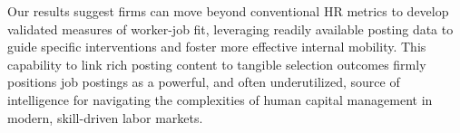 Our results suggest firms can move beyond conventional HR metrics to develop validated measures of worker-job fit, leveraging readily available posting data 
to guide specific interventions and foster more effective internal mobility. This capability to link rich posting content to tangible selection outcomes 
firmly positions job postings as a powerful, and often underutilized, source of intelligence for navigating the complexities of human capital management 
in modern, skill-driven labor markets.